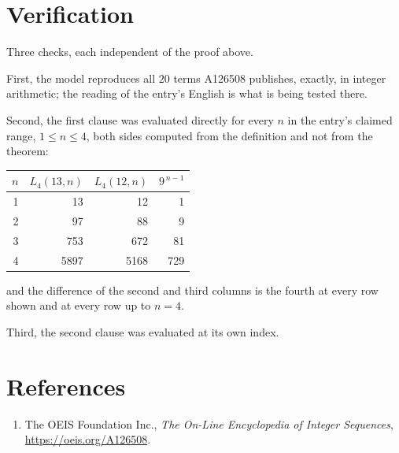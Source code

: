 \documentclass[11pt,a4paper]{article}
\theoremstyle{plain}
\theoremstyle{definition}
\begin{document}
\section{Verification}

Three checks, each independent of the proof above.

First, the model reproduces all $20$ terms A126508 publishes, exactly, in integer
arithmetic; the reading of the entry's English is what is being tested there.

Second, the first clause was evaluated directly for every $n$ in the entry's claimed range,
$1\le n\le4$, both sides computed from the definition and not from the theorem:

\begin{center}
\begin{tabular}{rrrr}
$n$ & $L_{4}(13,n)$ & $L_{4}(12,n)$ & $9^{\,n-1}$ \\ \hline
1 & 13 & 12 & 1 \\
2 & 97 & 88 & 9 \\
3 & 753 & 672 & 81 \\
4 & 5897 & 5168 & 729 \\
\end{tabular}
\end{center}

\noindent and the difference of the second and third columns is the fourth at every row shown
and at every row up to $n=4$.

Third, the second clause was evaluated at its own index.

\section*{References}
\begin{enumerate}
\item The OEIS Foundation Inc., \emph{The On-Line Encyclopedia of Integer Sequences},
\url{https://oeis.org/A126508}.
\end{enumerate}
\end{document}
